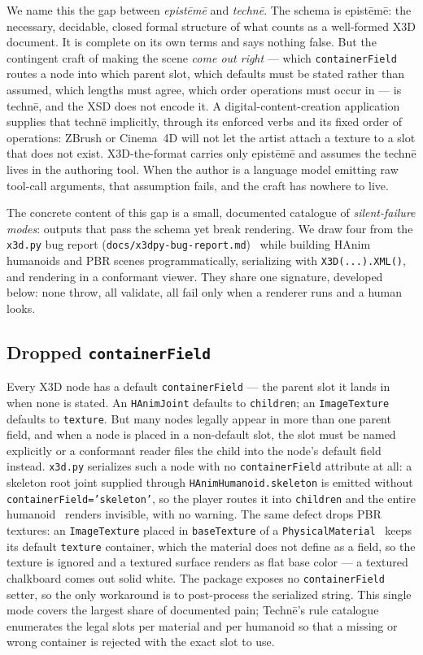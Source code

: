 \documentclass[sigconf,nonacm,screen,anonymous]{acmart}
\begin{document}
We name this the gap between \emph{epistēmē} and \emph{technē}. The schema is epistēmē: the necessary, decidable, closed formal structure of what counts as a well-formed X3D document. It is complete on its own terms and says nothing false. But the contingent craft of making the scene \emph{come out right} --- which \texttt{containerField} routes a node into which parent slot, which defaults must be stated rather than assumed, which lengths must agree, which order operations must occur in --- is technē, and the XSD does not encode it. A digital-content-creation application supplies that technē implicitly, through its enforced verbs and its fixed order of operations: ZBrush or Cinema~4D will not let the artist attach a texture to a slot that does not exist. X3D-the-format carries only epistēmē and assumes the technē lives in the authoring tool. When the author is a language model emitting raw tool-call arguments, that assumption fails, and the craft has nowhere to live.

The concrete content of this gap is a small, documented catalogue of \emph{silent-failure modes}: outputs that pass the schema yet break rendering. We draw four from the \texttt{x3d.py} bug report (\texttt{docs/x3dpy-bug-report.md})~\cite{x3dpy} while building HAnim humanoids and PBR scenes programmatically, serializing with \texttt{X3D(...).XML()}, and rendering in a conformant viewer. They share one signature, developed below: none throw, all validate, all fail only when a renderer runs and a human looks.

\subsection{Dropped \texttt{containerField}}
Every X3D node has a default \texttt{containerField} --- the parent slot it lands in when none is stated. An \texttt{HAnimJoint} defaults to \texttt{children}; an \texttt{ImageTexture} defaults to \texttt{texture}. But many nodes legally appear in more than one parent field, and when a node is placed in a non-default slot, the slot must be named explicitly or a conformant reader files the child into the node's default field instead. \texttt{x3d.py} serializes such a node with no \texttt{containerField} attribute at all: a skeleton root joint supplied through \texttt{HAnimHumanoid.skeleton} is emitted without \texttt{containerField='skeleton'}, so the player routes it into \texttt{children} and the entire humanoid~\cite{hanim} renders invisible, with no warning. The same defect drops PBR textures: an \texttt{ImageTexture} placed in \texttt{baseTexture} of a \texttt{PhysicalMaterial}~\cite{gltf} keeps its default \texttt{texture} container, which the material does not define as a field, so the texture is ignored and a textured surface renders as flat base color --- a textured chalkboard comes out solid white. The package exposes no \texttt{containerField} setter, so the only workaround is to post-process the serialized string. This single mode covers the largest share of documented pain; Technē's rule catalogue enumerates the legal slots per material and per humanoid so that a missing or wrong container is rejected with the exact slot to use.
\end{document}

